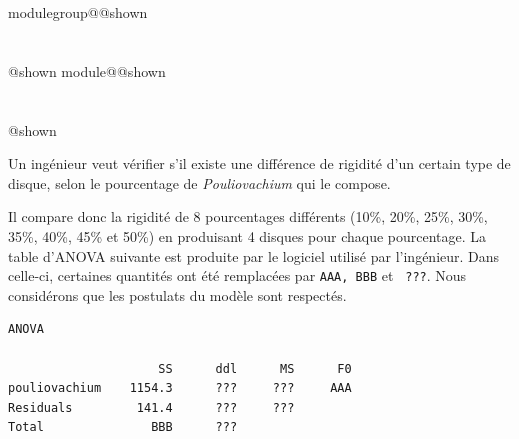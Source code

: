 \documentclass{Evaluation}
\makeatletter
\newcommand{\currentmodulekey}{}
\newcommand{\currentmoduletitle}{}
\newcommand{\currentgroupkey}{}
\newcommand{\currentgrouptitle}{}
\newcommand{\showmoduleifneeded}{%
  \ifx\currentgroupkey\empty\else
    \expandafter\ifx\csname modulegroup@\currentgroupkey @shown\endcsname\relax
      \section*{\currentgrouptitle}%
      \expandafter\gdef\csname modulegroup@\currentgroupkey @shown\endcsname{1}%
    \fi
  \fi
  \expandafter\ifx\csname module@\currentmodulekey @shown\endcsname\relax
    \section*{\currentmoduletitle}%
    \expandafter\gdef\csname module@\currentmodulekey @shown\endcsname{1}%
  \fi
}
\newenvironment{H26}{\showmoduleifneeded}{}
\makeatother
\begin{document}
\begin{questions}
\begin{H26}
\question {} %
Un ingénieur veut vérifier s'il existe une différence de rigidité d'un certain type de disque, selon le pourcentage de \textit{Pouliovachium} qui le compose.

Il compare donc la rigidité de 8 pourcentages différents (10\%, 20\%, 25\%, 30\%, 35\%, 40\%, 45\% et 50\%) en produisant 4 disques pour chaque pourcentage.
La table d'ANOVA suivante est produite par le logiciel utilisé par l'ingénieur.
Dans celle-ci, certaines quantités ont été remplacées par \texttt{AAA, BBB} et \texttt{ ???}. Nous considérons que les postulats du modèle sont respectés.
\begin{verbatim}
ANOVA

                     SS      ddl      MS      F0
pouliovachium    1154.3      ???     ???     AAA
Residuals         141.4      ???     ???
Total               BBB      ???
\end{verbatim}

\end{H26}
\end{questions}
\end{document}
